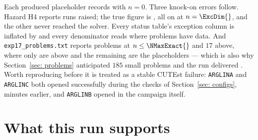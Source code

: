 \documentclass[11pt,a4paper]{article}
\theoremstyle{remark}
\begin{document}
\begin{description}[leftmargin=1.8em, style=nextline]
  \item[D4. \NNeverOp{} problems that never opened are counted as solver failures.]
    Each produced \NRunsPerProblem{} placeholder records with $n = 0$. Three
    knock-on errors follow. Hazard H4 reports \NExcReported{} runs raised; the true
    figure is \NExcArchived{}, all on \ExcProblems{} at $n = \ExcDim{}$, and the
    other \NExcPhantom{} never reached the solver. Every status table's exception
    column is inflated by \NNeverOp{} and every denominator reads \NListed{} where
    \NOpened{} problems have data. And \texttt{exp17\_problems.txt} reports
    \NSmall{} problems at $n \leq \NMaxExact{}$ and $17$ above, where only \NBig{}
    are above and the remaining \NNeverOp{} are the placeholders --- which is also
    why Section~\ref{sec: problems} anticipated $185$ small problems and the run
    delivered \NSmall{}. Worth reproducing before it is treated as a stable CUTEst
    failure: \texttt{ARGLINA} and \texttt{ARGLINC} both opened successfully during
    the checks of Section~\ref{sec: configs}, minutes earlier, and
    \texttt{ARGLINB} opened in the campaign itself.
\end{description}

\section{What this run supports}\label{sec: supports}
\end{document}
